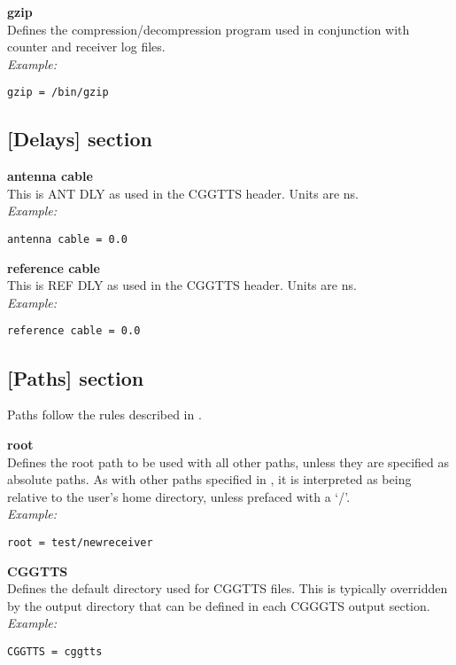\hypertarget{h:misc}{}

{\bfseries gzip}\\
Defines the compression/decompression program used in conjunction with counter and receiver log files.\\
\textit{Example:}
\begin{lstlisting}
gzip = /bin/gzip 
\end{lstlisting}

\subsection{[Delays] section}

\hypertarget{h:delays}{}

{\bfseries antenna cable}\\
This is ANT DLY as used in the CGGTTS header. Units are ns.\\
\textit{Example:}
\begin{lstlisting}
antenna cable = 0.0
\end{lstlisting}

{\bfseries reference cable}\\
This is REF DLY as used in the CGGTTS header. Units are ns.\\
\textit{Example:}
\begin{lstlisting}
reference cable = 0.0
\end{lstlisting}

\subsection{[Paths] section} 

\hypertarget{h:paths}{}

Paths follow the rules described in .

{\bfseries root}\\ \hypertarget{h:rootpath}{}
Defines the root path to be used with all other paths, unless they are specified as absolute paths.
As with other paths specified in , it is interpreted as being relative to the user's
home directory, unless prefaced with a `/'.\\
\textit{Example:}
\begin{lstlisting}
root = test/newreceiver
\end{lstlisting}

{\bfseries CGGTTS}\\
Defines the default directory used for CGGTTS files.
This is typically overridden by the output directory that can be  defined in each CGGGTS output section.\\
\textit{Example:}
\begin{lstlisting}
CGGTTS = cggtts
\end{lstlisting}

